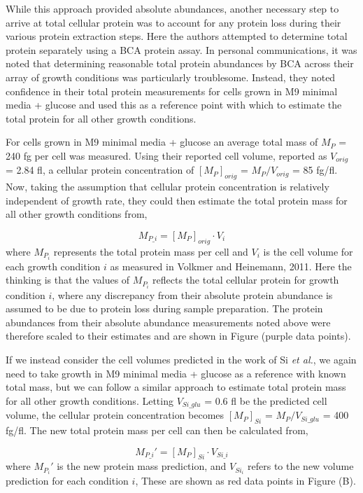 While this approach provided absolute abundances, another necessary step
to arrive at total cellular protein was to account for any protein loss during
their various protein extraction steps. Here the authors attempted to determine
total protein separately using a BCA protein assay.  In personal communications,
it was noted that determining reasonable total protein abundances by BCA across
their array of growth conditions  was particularly troublesome. Instead, they
noted confidence in their total protein measurements for cells grown in M9
minimal media + glucose and  used this as a reference point with which to
estimate the total protein for all other growth conditions.

For cells grown in M9 minimal media + glucose an average total mass of $M_P$ =
240 fg per cell was measured. Using their reported cell volume, reported as
$V_{orig}$ = 2.84 fl, a cellular protein concentration of $[M_P]_{orig}$ =
$M_P/V_{orig}$ = 85 fg/fl. Now, taking the assumption that cellular protein
concentration is relatively independent of growth rate, they could then estimate
the total protein mass for all other growth conditions from,

\begin{equation}
	M_{P\_i} = [M_P]_{orig} \cdot V_{i}
\end{equation}
where $M_{P_i}$ represents the total protein mass per cell and $V_{i}$ is the
cell volume for each growth condition $i$ as measured in Volkmer and Heinemann,
2011. Here the thinking is that the values of $M_{P_i}$ reflects the total
cellular protein for growth condition $i$, where any discrepancy from their
absolute protein abundance is assumed to be due to protein loss during sample
preparation. The protein abundances from their absolute abundance measurements
noted above were therefore scaled to their estimates and are  shown in Figure
 (purple data points).

If we instead consider the cell volumes predicted in the work of Si \textit{et
al.}, we again need to take growth in M9 minimal media + glucose as a reference
with known total mass, but we can follow a similar approach to estimate total
protein mass for all other growth conditions. Letting  $V_{Si\_glu}$ = 0.6 fl be
the predicted cell volume, the cellular protein concentration becomes
$[M_P]_{Si}$ = $M_P/V_{Si\_glu}$ = 400 fg/fl. The new total protein mass per
cell can then be calculated from,

\begin{equation}
	M_{P\_i}' = [M_P]_{Si} \cdot V_{Si\_i}
\end{equation}
where $M_{P_i}'$ is the new protein mass prediction, and $V_{Si_i}$ refers to
the new volume prediction for each condition $i$, These are shown as red data points in
Figure (B).



